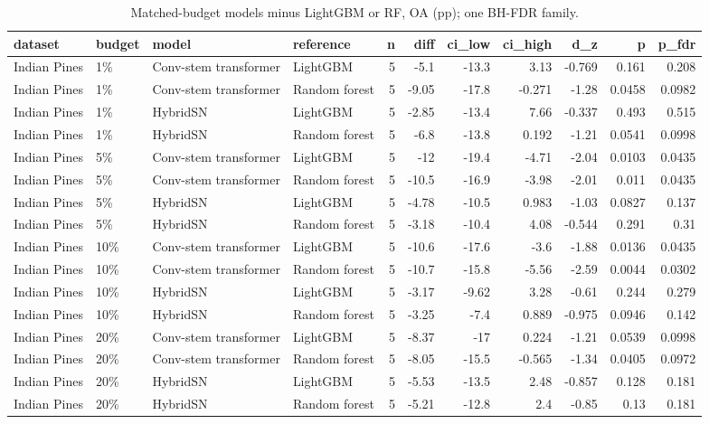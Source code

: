 \begin{table}
\caption{Matched-budget models minus LightGBM or RF, OA (pp); one BH-FDR family.}
\label{tab:stats_matched_vs_baselines}
\begin{tabular}{llllrrrrrrr}
\toprule
dataset & budget & model & reference & n & diff & ci\_low & ci\_high & d\_z & p & p\_fdr \\
\midrule
Indian Pines & 1\% & Conv-stem transformer & LightGBM & 5 & -5.1 & -13.3 & 3.13 & -0.769 & 0.161 & 0.208 \\
Indian Pines & 1\% & Conv-stem transformer & Random forest & 5 & -9.05 & -17.8 & -0.271 & -1.28 & 0.0458 & 0.0982 \\
Indian Pines & 1\% & HybridSN & LightGBM & 5 & -2.85 & -13.4 & 7.66 & -0.337 & 0.493 & 0.515 \\
Indian Pines & 1\% & HybridSN & Random forest & 5 & -6.8 & -13.8 & 0.192 & -1.21 & 0.0541 & 0.0998 \\
Indian Pines & 5\% & Conv-stem transformer & LightGBM & 5 & -12 & -19.4 & -4.71 & -2.04 & 0.0103 & 0.0435 \\
Indian Pines & 5\% & Conv-stem transformer & Random forest & 5 & -10.5 & -16.9 & -3.98 & -2.01 & 0.011 & 0.0435 \\
Indian Pines & 5\% & HybridSN & LightGBM & 5 & -4.78 & -10.5 & 0.983 & -1.03 & 0.0827 & 0.137 \\
Indian Pines & 5\% & HybridSN & Random forest & 5 & -3.18 & -10.4 & 4.08 & -0.544 & 0.291 & 0.31 \\
Indian Pines & 10\% & Conv-stem transformer & LightGBM & 5 & -10.6 & -17.6 & -3.6 & -1.88 & 0.0136 & 0.0435 \\
Indian Pines & 10\% & Conv-stem transformer & Random forest & 5 & -10.7 & -15.8 & -5.56 & -2.59 & 0.0044 & 0.0302 \\
Indian Pines & 10\% & HybridSN & LightGBM & 5 & -3.17 & -9.62 & 3.28 & -0.61 & 0.244 & 0.279 \\
Indian Pines & 10\% & HybridSN & Random forest & 5 & -3.25 & -7.4 & 0.889 & -0.975 & 0.0946 & 0.142 \\
Indian Pines & 20\% & Conv-stem transformer & LightGBM & 5 & -8.37 & -17 & 0.224 & -1.21 & 0.0539 & 0.0998 \\
Indian Pines & 20\% & Conv-stem transformer & Random forest & 5 & -8.05 & -15.5 & -0.565 & -1.34 & 0.0405 & 0.0972 \\
Indian Pines & 20\% & HybridSN & LightGBM & 5 & -5.53 & -13.5 & 2.48 & -0.857 & 0.128 & 0.181 \\
Indian Pines & 20\% & HybridSN & Random forest & 5 & -5.21 & -12.8 & 2.4 & -0.85 & 0.13 & 0.181 \\

\end{tabular}
\end{table}
